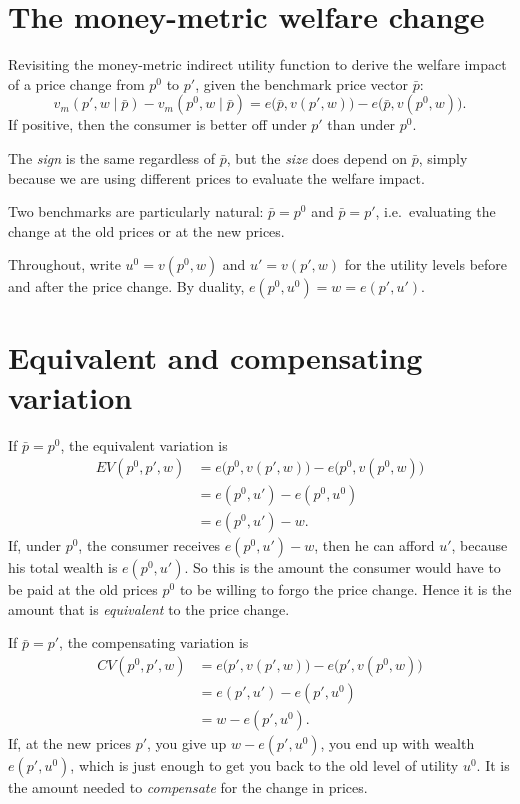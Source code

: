 \documentclass[11pt]{article}
\begin{document}


\section{The money-metric welfare change}

Revisiting the money-metric indirect utility function to derive the welfare impact
of a price change from $p^0$ to $p'$, given the benchmark price vector $\bar p$:
\[ v_m(p',w\mid\bar p)-v_m(p^0,w\mid\bar p)
   =e\bigl(\bar p,v(p',w)\bigr)-e\bigl(\bar p,v(p^0,w)\bigr). \]
If positive, then the consumer is better off under $p'$ than under $p^0$.

The \emph{sign} is the same regardless of $\bar p$, but the \emph{size} does depend
on $\bar p$, simply because we are using different prices to evaluate the welfare
impact.

Two benchmarks are particularly natural: $\bar p=p^0$ and $\bar p=p'$, i.e.\
evaluating the change at the old prices or at the new prices.

Throughout, write $u^0=v(p^0,w)$ and $u'=v(p',w)$ for the utility levels before
and after the price change. By duality,
$e(p^0,u^0)=w=e(p',u')$.

\section{Equivalent and compensating variation}

If $\bar p=p^0$, the equivalent variation is
\begin{align*}
  EV(p^0,p',w)&=e\bigl(p^0,v(p',w)\bigr)-e\bigl(p^0,v(p^0,w)\bigr)\\
              &=e(p^0,u')-e(p^0,u^0)\\
              &=e(p^0,u')-w .
\end{align*}
If, under $p^0$, the consumer receives $e(p^0,u')-w$, then he can afford $u'$,
because his total wealth is $e(p^0,u')$. So this is the amount the consumer would
have to be paid at the old prices $p^0$ to be willing to forgo the price change. Hence it is the amount
that is \emph{equivalent} to the price change.

If $\bar p=p'$, the compensating variation is
\begin{align*}
  CV(p^0,p',w)&=e\bigl(p',v(p',w)\bigr)-e\bigl(p',v(p^0,w)\bigr)\\
              &=e(p',u')-e(p',u^0)\\
              &=w-e(p',u^0).
\end{align*}
If, at the new prices $p'$, you give up $w-e(p',u^0)$, you end up with wealth
$e(p',u^0)$, which is just enough to get you back to the old level of utility $u^0$.
It is the amount needed to \emph{compensate} for the change in prices.
\end{document}
